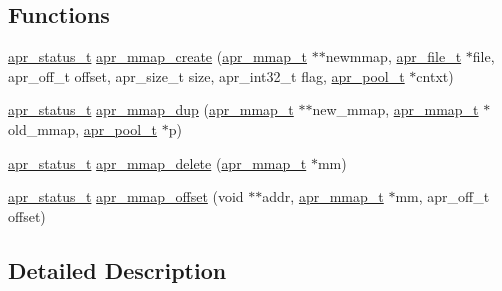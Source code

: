 \subsection*{Functions}
\begin{DoxyCompactItemize}
\item 
\hyperlink{group__apr__errno_gaf76ee4543247e9fb3f3546203e590a6c}{apr\-\_\-status\-\_\-t} \hyperlink{group__apr__mmap_gac6b103139be2e859741ec94cc6ad34cc}{apr\-\_\-mmap\-\_\-create} (\hyperlink{structapr__mmap__t}{apr\-\_\-mmap\-\_\-t} $\ast$$\ast$newmmap, \hyperlink{group__apr__file__io_gaa46e4763ac375ea3c7a43ba6f6099e22}{apr\-\_\-file\-\_\-t} $\ast$file, apr\-\_\-off\-\_\-t offset, apr\-\_\-size\-\_\-t size, apr\-\_\-int32\-\_\-t flag, \hyperlink{group__apr__pools_gaf137f28edcf9a086cd6bc36c20d7cdfb}{apr\-\_\-pool\-\_\-t} $\ast$cntxt)
\item 
\hyperlink{group__apr__errno_gaf76ee4543247e9fb3f3546203e590a6c}{apr\-\_\-status\-\_\-t} \hyperlink{group__apr__mmap_ga9fcdbf8090e924a4e8f2b301519bb4c8}{apr\-\_\-mmap\-\_\-dup} (\hyperlink{structapr__mmap__t}{apr\-\_\-mmap\-\_\-t} $\ast$$\ast$new\-\_\-mmap, \hyperlink{structapr__mmap__t}{apr\-\_\-mmap\-\_\-t} $\ast$old\-\_\-mmap, \hyperlink{group__apr__pools_gaf137f28edcf9a086cd6bc36c20d7cdfb}{apr\-\_\-pool\-\_\-t} $\ast$p)
\item 
\hyperlink{group__apr__errno_gaf76ee4543247e9fb3f3546203e590a6c}{apr\-\_\-status\-\_\-t} \hyperlink{group__apr__mmap_ga4b67a2d22a07707897cc1183a1682040}{apr\-\_\-mmap\-\_\-delete} (\hyperlink{structapr__mmap__t}{apr\-\_\-mmap\-\_\-t} $\ast$mm)
\item 
\hyperlink{group__apr__errno_gaf76ee4543247e9fb3f3546203e590a6c}{apr\-\_\-status\-\_\-t} \hyperlink{group__apr__mmap_ga4c1d31bd9e911744bd5edb97e17210ec}{apr\-\_\-mmap\-\_\-offset} (void $\ast$$\ast$addr, \hyperlink{structapr__mmap__t}{apr\-\_\-mmap\-\_\-t} $\ast$mm, apr\-\_\-off\-\_\-t offset)
\end{DoxyCompactItemize}


\subsection{Detailed Description}


